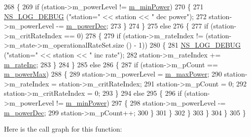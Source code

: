 \begin{DoxyCode}
268         \{
269           \textcolor{keywordflow}{if} (station->m\_powerLevel != \hyperlink{classns3_1_1AparfWifiManager_a4cca2208e9b2c93a96b5e1442434451b}{m\_minPower})
270             \{
271               \hyperlink{group__logging_ga413f1886406d49f59a6a0a89b77b4d0a}{NS\_LOG\_DEBUG} (\textcolor{stringliteral}{"station="} << station << \textcolor{stringliteral}{" dec power"});
272               station->m\_powerLevel -= \hyperlink{classns3_1_1AparfWifiManager_a802d7ed4d81a0f749afd4033950e0c31}{m\_powerDec};
273             \}
274         \}
275       \textcolor{keywordflow}{else}
276         \{
277           \textcolor{keywordflow}{if} (station->m\_critRateIndex == 0)
278             \{
279               \textcolor{keywordflow}{if} (station->m\_rateIndex != (station->m\_state->m\_operationalRateSet.size () - 1))
280                 \{
281                   \hyperlink{group__logging_ga413f1886406d49f59a6a0a89b77b4d0a}{NS\_LOG\_DEBUG} (\textcolor{stringliteral}{"station="} << station << \textcolor{stringliteral}{" inc rate"});
282                   station->m\_rateIndex += \hyperlink{classns3_1_1AparfWifiManager_a46d7ecaf54a04e145e4be183c042a65e}{m\_rateInc};
283                 \}
284             \}
285           \textcolor{keywordflow}{else}
286             \{
287               \textcolor{keywordflow}{if} (station->m\_pCount == \hyperlink{classns3_1_1AparfWifiManager_a4879816bad5b15bfadc1326a3b636477}{m\_powerMax})
288                 \{
289                   station->m\_powerLevel = \hyperlink{classns3_1_1AparfWifiManager_a732bf09011390e3a9ca7f703d847215e}{m\_maxPower};
290                   station->m\_rateIndex = station->m\_critRateIndex;
291                   station->m\_pCount = 0;
292                   station->m\_critRateIndex = 0;
293                 \}
294               \textcolor{keywordflow}{else}
295                 \{
296                   \textcolor{keywordflow}{if} (station->m\_powerLevel != \hyperlink{classns3_1_1AparfWifiManager_a4cca2208e9b2c93a96b5e1442434451b}{m\_minPower})
297                     \{
298                       station->m\_powerLevel -= \hyperlink{classns3_1_1AparfWifiManager_a802d7ed4d81a0f749afd4033950e0c31}{m\_powerDec};
299                       station->m\_pCount++;
300                     \}
301                 \}
302             \}
303         \}
304     \}
305 \}
\end{DoxyCode}


Here is the call graph for this function\+:


